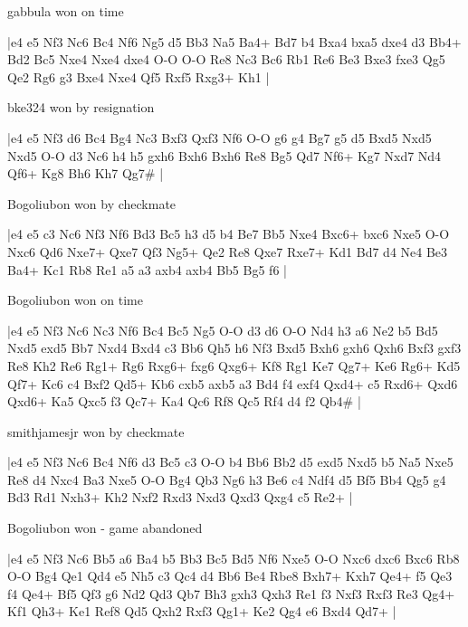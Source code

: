 \showboard

gabbula won on time

\makegametitle
|e4 e5 Nf3 Nc6 Bc4 Nf6 Ng5 d5 Bb3 Na5 Ba4+ Bd7 b4 Bxa4 bxa5 dxe4 d3 Bb4+ Bd2 Bc5 Nxe4 Nxe4 dxe4 O-O O-O Re8 Nc3 Bc6 Rb1 Re6 Be3 Bxe3 fxe3 Qg5 Qe2 Rg6 g3 Bxe4 Nxe4 Qf5 Rxf5 Rxg3+ Kh1  |

\showboard

bke324 won by resignation

\makegametitle
|e4 e5 Nf3 d6 Bc4 Bg4 Nc3 Bxf3 Qxf3 Nf6 O-O g6 g4 Bg7 g5 d5 Bxd5 Nxd5 Nxd5 O-O d3 Nc6 h4 h5 gxh6 Bxh6 Bxh6 Re8 Bg5 Qd7 Nf6+ Kg7 Nxd7 Nd4 Qf6+ Kg8 Bh6 Kh7 Qg7\#  |

\showboard

Bogoliubon won by checkmate

\makegametitle
|e4 e5 c3 Nc6 Nf3 Nf6 Bd3 Bc5 h3 d5 b4 Be7 Bb5 Nxe4 Bxc6+ bxc6 Nxe5 O-O Nxc6 Qd6 Nxe7+ Qxe7 Qf3 Ng5+ Qe2 Re8 Qxe7 Rxe7+ Kd1 Bd7 d4 Ne4 Be3 Ba4+ Kc1 Rb8 Re1 a5 a3 axb4 axb4 Bb5 Bg5 f6  |

\showboard

Bogoliubon won on time

\makegametitle
|e4 e5 Nf3 Nc6 Nc3 Nf6 Bc4 Bc5 Ng5 O-O d3 d6 O-O Nd4 h3 a6 Ne2 b5 Bd5 Nxd5 exd5 Bb7 Nxd4 Bxd4 c3 Bb6 Qh5 h6 Nf3 Bxd5 Bxh6 gxh6 Qxh6 Bxf3 gxf3 Re8 Kh2 Re6 Rg1+ Rg6 Rxg6+ fxg6 Qxg6+ Kf8 Rg1 Ke7 Qg7+ Ke6 Rg6+ Kd5 Qf7+ Kc6 c4 Bxf2 Qd5+ Kb6 cxb5 axb5 a3 Bd4 f4 exf4 Qxd4+ c5 Rxd6+ Qxd6 Qxd6+ Ka5 Qxc5 f3 Qc7+ Ka4 Qc6 Rf8 Qc5 Rf4 d4 f2 Qb4\#  |

\showboard

smithjamesjr won by checkmate

\makegametitle
|e4 e5 Nf3 Nc6 Bc4 Nf6 d3 Bc5 c3 O-O b4 Bb6 Bb2 d5 exd5 Nxd5 b5 Na5 Nxe5 Re8 d4 Nxc4 Ba3 Nxe5 O-O Bg4 Qb3 Ng6 h3 Be6 c4 Ndf4 d5 Bf5 Bb4 Qg5 g4 Bd3 Rd1 Nxh3+ Kh2 Nxf2 Rxd3 Nxd3 Qxd3 Qxg4 c5 Re2+  |

\showboard

Bogoliubon won - game abandoned

\makegametitle
|e4 e5 Nf3 Nc6 Bb5 a6 Ba4 b5 Bb3 Bc5 Bd5 Nf6 Nxe5 O-O Nxc6 dxc6 Bxc6 Rb8 O-O Bg4 Qe1 Qd4 e5 Nh5 c3 Qc4 d4 Bb6 Be4 Rbe8 Bxh7+ Kxh7 Qe4+ f5 Qe3 f4 Qe4+ Bf5 Qf3 g6 Nd2 Qd3 Qb7 Bh3 gxh3 Qxh3 Re1 f3 Nxf3 Rxf3 Re3 Qg4+ Kf1 Qh3+ Ke1 Ref8 Qd5 Qxh2 Rxf3 Qg1+ Ke2 Qg4 e6 Bxd4 Qd7+  |

